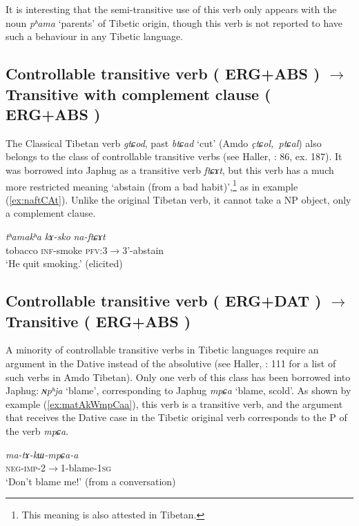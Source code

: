 \documentclass[oneside,a4paper,11pt]{article}
\makeatletter
\newcommand{\ipa}[1]{{\phon\textit{\mbox{#1}}}} %
\newcommand{\refb}[1]{(\ref{#1})}
\def\fakesc#1{%
  \begingroup%
  \xdef\fake@name{\csname\curr@fontshape/\f@size\endcsname}%
  \fontsize{\fontdimen8\fake@name}{\baselineskip}\selectfont%
  \uppercase{#1}%
  \endgroup%
}
\makeatother
\begin{document}
It is interesting that the semi-transitive use of this verb only appears with the noun \ipa{pʰama} `parents' of Tibetic origin, though this verb is not reported to have such a behaviour in any Tibetic language.



\subsection{Controllable transitive verb (\fakesc{erg+abs})  $\rightarrow$ Transitive with complement clause (\fakesc{erg+abs})}
The Classical Tibetan verb \ipa{gtɕod}, past \ipa{btɕad} `cut' (Amdo \ipa{çtɕol, ptɕal}) also belongs to the class of controllable transitive verbs (see Haller, \citeyear{haller04themchen}: 86, ex. 187). It was borrowed into Japhug as a transitive verb \ipa{ftɕɤt}, but this verb has a much more restricted meaning `abstain (from a bad habit)',\footnote{This meaning is also attested in Tibetan.} as in example \refb{ex:naftCAt}. Unlike the original Tibetan verb, it cannot take a NP object, only a complement clause.

\begin{exe}
\ex \label{ex:naftCAt}
\gll
\ipa{tʰamakʰa} \ipa{kɤ-sko} \ipa{na-ftɕɤt}\\
tobacco \textsc{inf}-smoke \textsc{pfv}:3$\rightarrow$3'-abstain \\
\glt `He quit smoking.' (elicited)
\end{exe}

\subsection{Controllable transitive verb (\fakesc{erg+dat})  $\rightarrow$ Transitive (\fakesc{erg+abs}) }
A minority of controllable transitive verbs in Tibetic languages require an argument in the Dative instead of the absolutive (see Haller, \citeyear{haller04themchen}: 111 for a list of such verbs in Amdo Tibetan). Only one verb of this class has been borrowed into Japhug: \ipa{ɴpʰja} `blame', corresponding to Japhug \ipa{mpɕa} `blame, scold'. As shown by example \refb{ex:matAkWmpCaa}, this verb is a transitive verb, and the argument that receives the Dative case in the Tibetic original verb corresponds to the P of the verb \ipa{mpɕa}.

\begin{exe}
\ex \label{ex:matAkWmpCaa}
\gll
  \ipa{ma-tɤ-kɯ-mpɕa-a} \\
  \textsc{neg-imp}-2$\rightarrow$1-blame-\textsc{1sg} \\
\glt `Don't blame me!' (from a conversation)
\end{exe}
  
\end{document}

